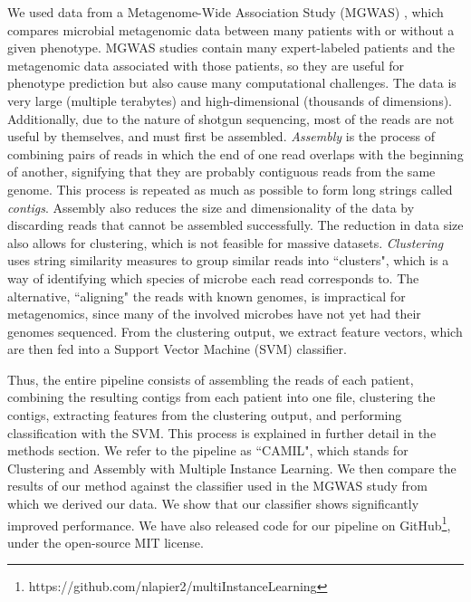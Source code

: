 We used data from a Metagenome-Wide Association Study (MGWAS) \cite{qin041012}, which compares microbial metagenomic data between many patients with or without a given phenotype. MGWAS studies contain many expert-labeled patients and the metagenomic data associated with those patients, so they are useful for phenotype prediction but also cause many computational challenges. The data is very large (multiple terabytes) and high-dimensional (thousands of dimensions). Additionally, due to the nature of shotgun sequencing, most of the reads are not useful by themselves, and must first be assembled. \emph{Assembly} is the process of combining pairs of reads in which the end of one read overlaps with the beginning of another, signifying that they are probably contiguous reads from the same genome. This process is repeated as much as possible to form long strings called \emph{contigs}. Assembly also reduces the size and dimensionality of the data by discarding reads that cannot be assembled successfully. The reduction in data size also allows for clustering, which is not feasible for massive datasets. \emph{Clustering} uses string similarity measures to group similar reads into ``clusters", which is a way of identifying which species of microbe each read corresponds to. The alternative, ``aligning" the reads with known genomes, is impractical for metagenomics, since many of the involved microbes have not yet had their genomes sequenced. From the clustering output, we extract feature vectors, which are then fed into a Support Vector Machine (SVM) classifier. 

Thus, the entire pipeline consists of assembling the reads of each patient, combining the resulting contigs from each patient into one file, clustering the contigs, extracting features from the clustering output, and performing classification with the SVM. This process is explained in further detail in the methods section. We refer to the pipeline as ``CAMIL", which stands for Clustering and Assembly with Multiple Instance Learning. We then compare the results of our method against the classifier used in the MGWAS study \cite{qin041012} from which we derived our data. We show that our classifier shows significantly improved performance. We have also released code for our pipeline on GitHub\footnote{https://github.com/nlapier2/multiInstanceLearning},
under the open-source MIT license.

